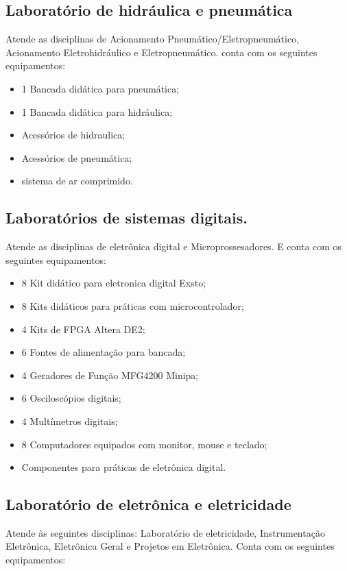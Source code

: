 \subsection{Laboratório de hidráulica e pneumática}
Atende as disciplinas de Acionamento Pneumático/Eletropneumático, Acionamento Eletrohidráulico e Eletropneumático. conta com os seguintes equipamentos:

\begin{itemize}
\item 1 Bancada didática para pneumática;
\item 1 Bancada didática para hidráulica;
\item Acessórios de hidraulica;
\item Acessórios de pneumática;
\item sistema de ar comprimido.
\end{itemize}

\subsection{Laboratórios de sistemas digitais.}
Atende as disciplinas de eletrônica digital e Microprossesadores. E conta com os seguintes equipamentos:
\begin{itemize}
\item 8 Kit didático para eletronica digital Exsto;
\item 8 Kits didáticos para práticas com microcontrolador;
\item 4 Kits de FPGA Altera DE2;
\item 6 Fontes de alimentação para bancada;
\item 4 Geradores de Função MFG4200 Minipa;
\item 6 Osciloscópios digitais;
\item 4 Multímetros digitais;
\item 8 Computadores equipados com monitor, mouse e teclado;
\item Componentes para práticas de eletrônica digital.
\end{itemize}

\subsection{Laboratório de eletrônica e eletricidade}
Atende às seguintes disciplinas: Laboratório de eletricidade, Instrumentação Eletrônica, Eletrônica Geral e Projetos em Eletrônica. Conta com os seguintes equipamentos:

